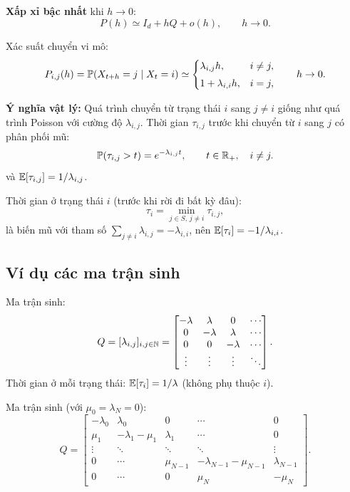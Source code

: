 \textbf{Xấp xỉ bậc nhất} khi $h \to 0$:
\[
  P(h) \simeq I_d + hQ + o(h), \qquad h \to 0.
\]

Xác suất chuyển vi mô:
\[
  P_{i,j}(h) = \mathbb{P}(X_{t+h} = j \mid X_t = i) \simeq
  \begin{cases}
    \lambda_{i,j} h, & i \neq j, \\[3pt]
    1 + \lambda_{i,i} h, & i = j,
  \end{cases}
  \qquad h \to 0.
\]

\textbf{Ý nghĩa vật lý:} Quá trình chuyển từ trạng thái $i$ sang $j \neq i$ giống như quá trình Poisson với cường độ $\lambda_{i,j}$. Thời gian $\tau_{i,j}$ trước khi chuyển từ $i$ sang $j$ có phân phối mũ:
\begin{equation}\label{eq:sojourn-exp}
  \mathbb{P}(\tau_{i,j} > t) = e^{-\lambda_{i,j} t}, \qquad t \in \mathbb{R}_+, \quad i \neq j.
\end{equation}
và $\mathbb{E}[\tau_{i,j}] = 1/\lambda_{i,j}$.

Thời gian ở trạng thái $i$ (trước khi rời đi bất kỳ đâu):
\[
  \tau_i = \min_{j \in S,\, j \neq i} \tau_{i,j},
\]
là biến mũ với tham số $\sum_{j \neq i} \lambda_{i,j} = -\lambda_{i,i}$, nên $\mathbb{E}[\tau_i] = -1/\lambda_{i,i}$.

\subsection{Ví dụ các ma trận sinh}

\begin{example}
Ma trận sinh:
\[
  Q = [\lambda_{i,j}]_{i,j\in\mathbb{N}} = \begin{bmatrix}
    -\lambda & \lambda & 0 & \cdots \\
    0 & -\lambda & \lambda & \cdots \\
    0 & 0 & -\lambda & \cdots \\
    \vdots & \vdots & \vdots & \ddots
  \end{bmatrix}.
\]
Thời gian ở mỗi trạng thái: $\mathbb{E}[\tau_i] = 1/\lambda$ (không phụ thuộc $i$).
\end{example}

\begin{example}
Ma trận sinh (với $\mu_0 = \lambda_N = 0$):
\[
  Q = \begin{bmatrix}
    -\lambda_0 & \lambda_0 & 0 & \cdots & 0 \\
    \mu_1 & -\lambda_1-\mu_1 & \lambda_1 & \cdots & 0 \\
    \vdots & \ddots & \ddots & \ddots & \vdots \\
    0 & \cdots & \mu_{N-1} & -\lambda_{N-1}-\mu_{N-1} & \lambda_{N-1} \\
    0 & \cdots & 0 & \mu_N & -\mu_N
  \end{bmatrix}.
\]
\end{example}

